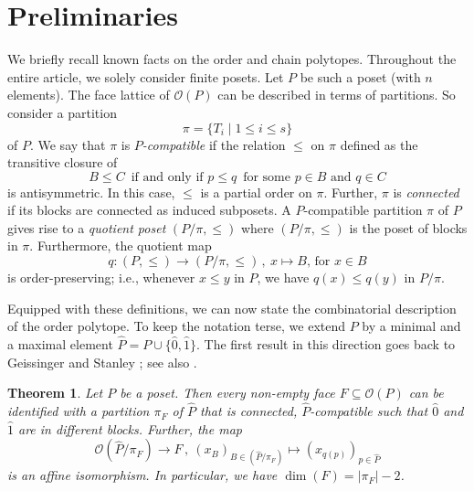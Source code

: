 \documentclass[12pt,a4paper]{amsart}
\newtheorem{theorem}{Theorem}[section]
\theoremstyle{definition}
\newcommand{\OP}{\mathcal{O}}
\begin{document}
\section{Preliminaries}\label{sec-prel}
We briefly recall known facts on the order and chain polytopes.
Throughout the entire article, we solely consider finite posets. 
Let $P$ be such a poset (with $n$ elements).
The face lattice of $\OP(P)$ can be described in terms of partitions.
So consider a partition
\begin{equation*}
    \pi=\{T_i\mid 1\leq i\leq s\}
\end{equation*}
of $P$.
We say that $\pi$ is \textit{$P$-compatible} if the relation $\leq$ on $\pi$ defined as the transitive closure of
\begin{equation*}
    B\leq C\,\text{ if and only if }p\leq q\, \text{ for some $p\in B$ and $q\in C$}
\end{equation*}
is antisymmetric. 
In this case, $\leq$ is a partial order on $\pi$. 
Further, $\pi$ is \textit{connected} if its blocks are connected as induced subposets.
A $P$-compatible partition $\pi$ of $P$ gives rise to a \emph{quotient poset} $(P/\pi,\leq)$ where $(P/\pi,\leq)$ is the poset of blocks in $\pi$.
Furthermore, the quotient map
\[
  q:(P,\leq)\rightarrow (P/\pi,\leq) \,,\ x\mapsto B\text{, for $x\in B$}
\]
is order-preserving; i.e., whenever $x\leq y$ in $P$, we have $q(x)\leq q(y)$ in $P/\pi$. 

Equipped with these definitions, we can now state the combinatorial description of the order polytope.
To keep the notation terse, we extend $P$ by a minimal and a maximal element $\hat{P} = P \cup \{ \hat{0}, \hat{1}\}$.
The first result in this direction goes back to Geissinger \cite{Geissinger} and Stanley \cite{Sta86}; see also \cite{Peg18}.
\begin{theorem}\label{Theorem-Order-Face-Partition}
Let $P$ be a poset. 
Then every non-empty face $F\subseteq\OP(P)$ can be identified with a partition $\pi_F$ of $\hat{P}$ that is connected, $\hat{P}$-compatible such that $\hat{0}$ and $\hat{1}$ are in different blocks.
Further, the map
\[
  \OP(\hat{P}/\pi_F)\rightarrow F \,,\ (x_{B})_{B\in (\hat{P}/\pi_{F})}\mapsto(x_{q(p)})_{p\in \hat{P}}
\]
is an affine isomorphism.
In particular, we have $\dim(F)=|\pi_F|-2$.
\end{theorem}
\end{document}
